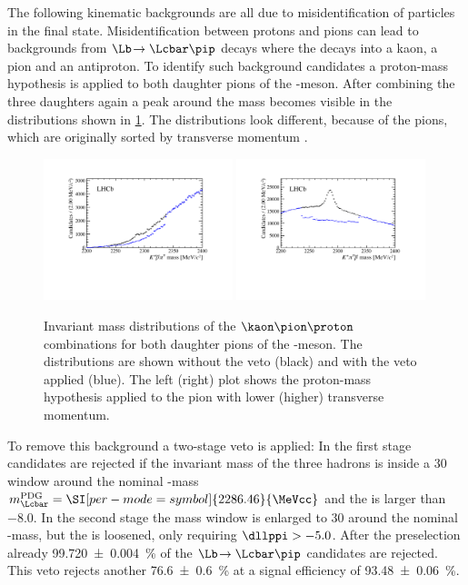 The following kinematic backgrounds are all due to misidentification of particles in the final state.
Misidentification between protons and pions can lead to backgrounds from $\Lb\!\to\Lcbar\pip$ decays where the \Lcbar decays into a kaon, a pion and an antiproton.
To identify such background candidates a proton-mass hypothesis is applied to both daughter pions of the \Dm-meson.
After combining the three \D daughters again a peak around the \Lc mass becomes visible in the distributions shown in \cref{fig:LcVeto}.
The distributions look different, because of the pions, which are originally sorted by transverse momentum \pt.
\begin{figure}[tbp]
    \centering
    \includegraphics[width=0.49\textwidth]{06selection/figs/LcHypo1.pdf}
    \includegraphics[width=0.49\textwidth]{06selection/figs/LcHypo2.pdf}
    \caption{Invariant mass distributions of the $\kaon\pion\proton$ combinations for both daughter pions of the \Dm-meson.
    The distributions are shown without the veto (black) and with the veto applied (blue).
    The left (right) plot shows the proton-mass hypothesis applied to the pion with lower (higher) transverse momentum.}
    \label{fig:LcVeto}
\end{figure}
To remove this background a two-stage veto is applied: In the first stage candidates are rejected if the invariant mass of the three hadrons is inside a \SI[per-mode=symbol]{30}{\MeVcc}  window around the nominal \mbox{\Lcbar-mass} $m_\Lcbar^{\text{PDG}}=\SI[per-mode=symbol]{2286.46}{\MeVcc}$ and the \dllppi is larger than \num{-8.0}.
In the second stage the mass window is enlarged to \SI[per-mode=symbol]{30}{\MeVcc} around the nominal \Lcbar-mass, but the \dllppi is loosened, only requiring $\dllppi>-5.0$.
After the preselection already \SI{99.720\pm0.004}{\percent} of the $\Lb\!\to\Lcbar\pip$ candidates are rejected.
This veto rejects another \SI{76.6\pm0.6}{\percent} at a signal efficiency of \SI{93.48\pm0.06}{\percent}.


